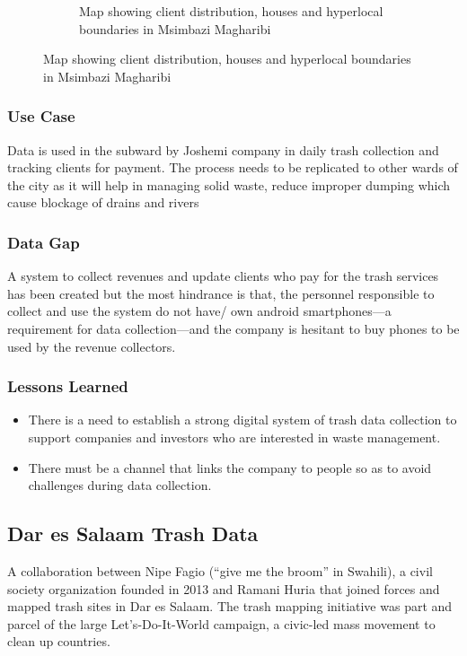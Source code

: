\documentclass[a4paper,12pt,twoside]{article}
\begin{document}
\begin{figure}
\begin{subfigure}[b]{0.5\textwidth}
    \color{RHgreen}\caption{Map showing client distribution, houses and hyperlocal boundaries in Msimbazi Magharibi}
    \label{fig:2}
  \end{subfigure}
\end{figure}

\subsubsection{Use Case}
Data is used in the subward by Joshemi company in daily trash collection and tracking clients for payment. The process needs to be replicated to other wards of the city as it will help in managing solid waste, reduce improper dumping which cause blockage of drains and rivers 

\subsubsection{Data Gap}
A system to collect  revenues and update clients who pay for the trash services has been created but the most hindrance is that, the personnel responsible to collect and use the system do not have/ own android smartphones---a requirement for data collection---and the company is hesitant to buy phones to be used by the revenue collectors.

\subsubsection{Lessons Learned}
\begin{itemize}
    \item There is a need to establish  a strong digital system of trash data collection to support companies and investors who are interested in waste management.
    \item There must be a channel that links the company to people so as to avoid challenges during data collection.
\end{itemize}

\newpage
\subsection{Dar es Salaam Trash Data}

A collaboration between Nipe Fagio (“give me the broom” in Swahili), a civil society organization founded in 2013 and Ramani Huria that joined forces and mapped trash sites in Dar es Salaam. The trash mapping initiative was part and parcel of the large Let’s-Do-It-World campaign, a civic-led mass movement to clean up countries.
\medskip
\end{document}
